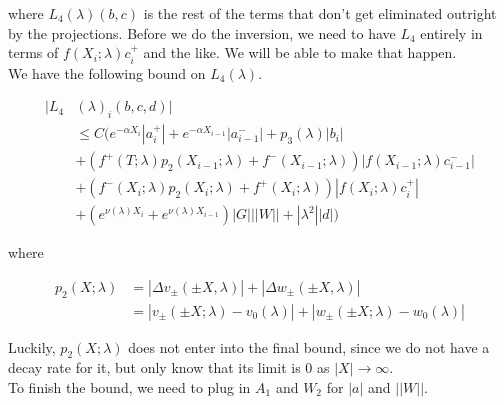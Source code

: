 \documentclass[12pt]{article}
\begin{document}
\begin{enumerate}
where $L_4(\lambda)(b, c)$ is the rest of the terms that don't get eliminated outright by the projections. Before we do the inversion, we need to have $L_4$ entirely in terms of $f(X_i; \lambda) c_i^+$ and the like. We will be able to make that happen. \\

We have the following bound on $L_4(\lambda)$. 

\begin{align*}
|L_4&(\lambda)_i(b, c, d)|\\ 
&\leq C \Big( e^{-\alpha X_i} |a_i^+| +  e^{-\alpha X_{i-1}} |a_{i-1}^-| + p_3(\lambda) |b_i| \\
&+ (f^+(T; \lambda) p_2(X_{i-1}; \lambda) + f^-(X_{i-1}; \lambda)) |f(X_{i-1}; \lambda) c_{i-1}^-| \\
&+ (f^-(X_i; \lambda) p_2(X_i; \lambda) + f^+(X_i; \lambda)) | f(X_i; \lambda) c_i^+| \\
&+ (e^{\nu(\lambda)X_i} + e^{\nu(\lambda)X_{i-1}}) |G| ||W|| + |\lambda^2| |d| \Big)
\end{align*}

where

\begin{align*}
p_2(X; \lambda) &= |\Delta v_\pm(\pm X, \lambda)| + |\Delta w_\pm(\pm X, \lambda)|\\
&= |v_\pm(\pm X; \lambda) - v_0(\lambda)| + |w_\pm(\pm X; \lambda) - w_0(\lambda)|
\end{align*}

Luckily, $p_2(X; \lambda)$ does not enter into the final bound, since we do not have a decay rate for it, but only know that its limit is 0 as $|X| \rightarrow \infty$.\\

To finish the bound, we need to plug in $A_1$ and $W_2$ for $|a|$ and $||W||$.


\end{enumerate}
\end{document}

